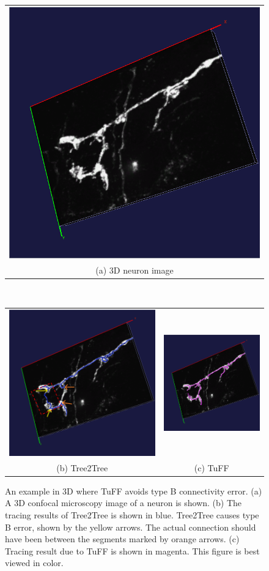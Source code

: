 \begin{figure}[h]
\centering
\renewcommand{\tabcolsep}{0.05cm}
	\begin{tabular}{@{}c @{}}
		\includegraphics[width=.5\linewidth]{./images/TuFF/orig} \\
		\scriptsize (a) 3D neuron image
	\end{tabular}
	\\
	\begin{tabular}{cc}
		\includegraphics[width=.5\linewidth]{./images/TuFF/TypeB} &
		\includegraphics[width=.5\linewidth]{./images/TuFF/TypeBTuFF} \\
		\scriptsize(b) Tree2Tree & \scriptsize(c) TuFF
	\end{tabular}
\caption[TuFF vs Tree2Tree for type B connection (3D)]{An example in 3D where TuFF avoids type B connectivity error. (a) A 3D confocal microscopy image of a neuron is shown. (b) The tracing results of Tree2Tree is shown in blue. Tree2Tree causes type B error, shown by the yellow arrows. The actual connection should have been between the segments marked by orange arrows. (c) Tracing result due to TuFF is shown in magenta. This figure is best viewed in color.}
\label{fig:TypeB3D}
\end{figure}
